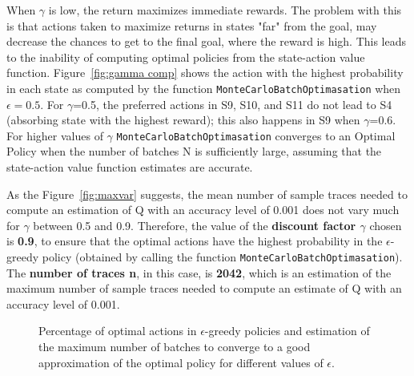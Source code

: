 \documentclass[11pt]{article}   	%
\begin{document}
When $\gamma$ is low, the return maximizes immediate rewards. The problem with this is that actions taken to maximize returns in states "far" from the goal, may decrease the chances to get to the final goal, where the reward is high. This leads to the inability of computing optimal policies from the state-action value function. Figure~\ref{fig:gamma comp} shows the action with the highest probability in each state as computed by the function \texttt{MonteCarloBatchOptimasation} when $\epsilon=0.5$. For $\gamma$=0.5, the preferred actions in S9, S10, and S11 do not lead to S4 (absorbing state with the highest reward); this also happens in S9 when $\gamma$=0.6. For higher values of $\gamma$ \texttt{MonteCarloBatchOptimasation} converges to an Optimal Policy when the number of batches N is sufficiently large, assuming that the state-action value function estimates are accurate.

As the Figure~\ref{fig:maxvar} suggests, the mean number of sample traces needed to compute an estimation of Q with an accuracy level of 0.001 does not vary much for $\gamma$ between 0.5 and 0.9. Therefore, the value of the \textbf{discount factor $\gamma$} chosen is \textbf{0.9}, to ensure that the optimal actions have the highest probability in the $\epsilon$-greedy policy (obtained by calling the function \texttt{MonteCarloBatchOptimasation}). The \textbf{number of traces n}, in this case, is \textbf{2042}, which is an estimation of the maximum number of sample traces needed to compute an estimate of Q with an accuracy level of 0.001.

\begin{figure}
\centering
\setlength\fboxsep{0pt}
\setlength\fboxrule{0.5pt}
\caption{Percentage of optimal actions in  $\epsilon$-greedy policies  and estimation of the maximum number of batches to converge to a good approximation of the optimal policy for different values of $\epsilon$. \label{fig:epsilon}}
\end{figure}
\end{document}

